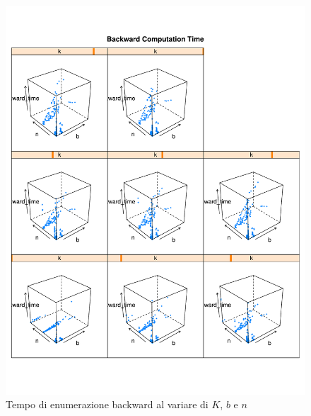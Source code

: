 \documentclass{llncs}
\begin{document}
\begin{figure}[!h]
  \centering
  \includegraphics[width=12cm]{img/graph_all-time_by_nbk_bw.pdf}
  \caption{Tempo di enumerazione backward al variare di $K$, $b$ e $n$}
  \label{fig:time_by_nbk_bw}
\end{figure}

\newpage
\end{document}
